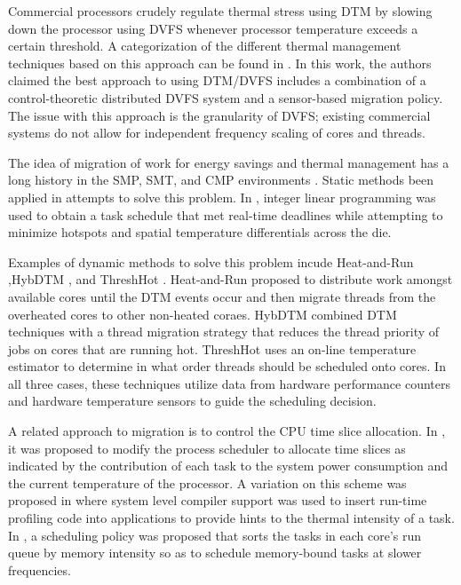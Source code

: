 \documentclass[times,12pt,onecolumn]{article}
\begin{document}
Commercial processors crudely regulate thermal stress using DTM by
slowing down the processor using DVFS whenever processor temperature
exceeds a certain threshold.  A categorization of the different thermal
management techniques based on this approach can be found in
\cite{Donald2006}.  In this work, the authors claimed the best approach
to using DTM/DVFS includes a combination of a control-theoretic
distributed DVFS system and a sensor-based migration policy.  The issue
with this approach is the granularity of DVFS; existing commercial
systems do not allow for independent frequency scaling of cores and
threads.

The idea of migration of work for energy savings and thermal management
has a long history in the SMP, SMT, and CMP environments
\cite{Yao1995}. Static methods been applied in attempts to solve this
problem.  In \cite{Coskun2008}, integer linear programming was used to
obtain a task schedule that met real-time deadlines while attempting to
minimize hotspots and spatial temperature differentials across the die.

Examples of dynamic methods to solve this problem incude Heat-and-Run
\cite{Gomaa2004},HybDTM \cite{Kumar2006}, and ThreshHot \cite{Yang2008}.
Heat-and-Run proposed to distribute work amongst available cores until
the DTM events occur and then migrate threads from the overheated cores
to other non-heated coraes. HybDTM combined DTM techniques with a thread
migration strategy that reduces the thread priority of jobs on cores
that are running hot. ThreshHot uses an on-line temperature estimator to
determine in what order threads should be scheduled onto cores. In all
three cases, these techniques utilize data from hardware performance
counters and hardware temperature sensors to guide the scheduling
decision.

A related approach to migration is to control the CPU time slice
allocation.  In \cite{Bellosa2003}, it was proposed to modify the
process scheduler to allocate time slices as indicated by the
contribution of each task to the system power consumption and the
current temperature of the processor. A variation on this scheme was
proposed in \cite{Li2008} where system level compiler support was used
to insert run-time profiling code into applications to provide hints to
the thermal intensity of a task. In \cite{Merkel2008}, a scheduling
policy was proposed that sorts the tasks in each core's run queue by
memory intensity so as to schedule memory-bound tasks at slower
frequencies.
\end{document}
